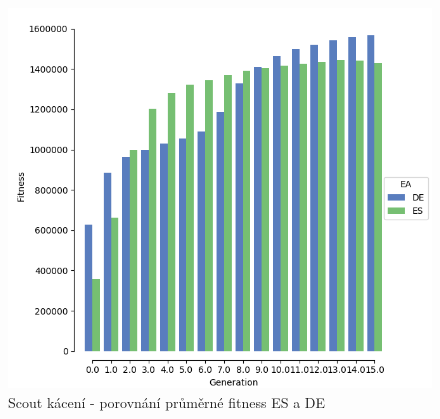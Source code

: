 		\begin{figure}[t]\centering
			\includegraphics[width=\columnwidth]{../img/WoodMap/DEvsES/WCuttorCutMem.png}
			\caption{Scout kácení - porovnání průměrné fitness ES a DE}
			\label{obr04:CutESvsDE}
		\end{figure}
